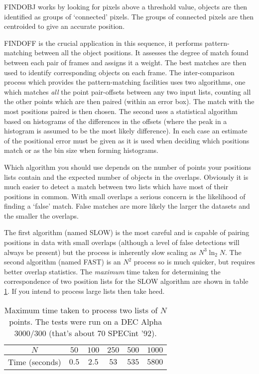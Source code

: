 \documentclass[twoside,11pt]{article}
\renewcommand{\_}{\texttt{\symbol{95}}}
\newcommand{\routine}[1]{{\sc #1}}
\begin{document}
\routine{FINDOBJ} works by looking for pixels above a threshold value, objects are
then identified as groups of `connected' pixels. The groups of connected
pixels are then centroided to give an accurate position.

\routine{FINDOFF} is the crucial application in this sequence, it performs
pattern-matching between all the object positions. It assesses the
degree of match found between each pair of frames and assigns it a
weight. The best matches are then used to identify corresponding objects
on each frame.  The inter-comparison process which provides the
pattern-matching facilities uses two algorithms, one which matches
{\em all} the point pair-offsets between any two input lists, counting
all the other points which are then paired (within an error box).  The
match with the most positions paired is then chosen. The second  uses a
statistical algorithm based on histograms of the differences in the
offsets (where the peak in a histogram is assumed to be the most likely
difference). In each case an estimate of the positional error must be
given as it is used when deciding which positions match or as the bin
size when forming histograms.

Which algorithm you should use depends on the number of points your
positions lists contain and the expected number of objects in the
overlaps. Obviously it is much easier to detect a match between  two
lists which have most of their positions in common. With small overlaps
a serious concern is the likelihood of finding a `false' match. False
matches are more likely the larger the datasets and the smaller the
overlaps.

The first algorithm (named SLOW) is the most careful and is capable of
pairing positions in data with small overlaps (although a level of false
detections will always be present) but the process is inherently slow
scaling as $N^{3}\ln_{2}N$. The second algorithm (named FAST) is an
$N^2$ process so is much quicker, but requires better overlap
statistics. The {\em maximum} time taken for determining the
correspondence of two position lists for the SLOW algorithm are shown in
table \ref{table1}. If you intend to process large lists then take heed.

\begin{table}[htb]
\begin{center}
\begin{tabular}{|c|c|c|c|c|c|}
\hline
$N$ & $50$ & $100$ & $250$ & $500$ & $1000$\\
\hline
Time (seconds) &
     $0.5$ & $2.5$ & $53$ & $535$ & $5800$\\
\hline
\end{tabular}
\caption{
Maximum time taken to process two lists of $N$ points. The tests were
run on a DEC Alpha 3000/300 (that's about $70$ SPECint '92). 
\label{table1}}
\end{center}
\end{table}
\end{document}
